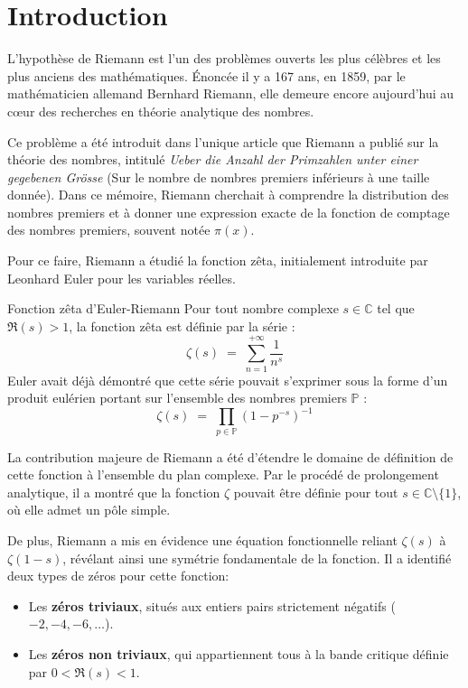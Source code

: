\documentclass[Riemann_Hypothesis.tex]{subfiles}
\begin{document}
\pagebreak
\color{red}
\part{Introduction}
\color{black}

L'hypothèse de Riemann est l'un des problèmes ouverts les plus célèbres 
et les plus anciens des mathématiques. Énoncée il y a 167 ans, en 1859, par 
le mathématicien allemand Bernhard Riemann, elle demeure encore aujourd'hui 
au cœur des recherches en théorie analytique des nombres. 

Ce problème a été introduit dans l'unique article que Riemann a publié sur la théorie 
des nombres, intitulé \textit{Ueber die Anzahl der Primzahlen unter einer gegebenen 
Grösse} (Sur le nombre de nombres premiers inférieurs à une taille donnée). 
Dans ce mémoire, Riemann cherchait à comprendre la distribution des 
nombres premiers et à donner une expression exacte de la fonction de comptage des 
nombres premiers, souvent notée $\pi(x)$.

Pour ce faire, Riemann a étudié la fonction zêta, initialement introduite 
par Leonhard Euler pour les variables réelles.

\begin{DefNef}[label=df:FonctionZetaEuler]{Fonction zêta d'Euler-Riemann}
    Pour tout nombre complexe $s \in \mathbb{C}$ tel que $\Re(s) > 1$, la fonction zêta est définie par la série :
    \begin{equation*}
        \zeta(s) \;=\; \sum_{n=1}^{+\infty} \frac{1}{n^s}
    \end{equation*}
    Euler avait déjà démontré que cette série pouvait 
    s'exprimer sous la forme d'un produit eulérien portant sur l'ensemble des 
    nombres premiers $\mathbb{P}$ :
    \begin{equation*}
        \zeta(s) \;=\; \prod_{p \in \mathbb{P}} \left(1 - p^{-s}\right)^{-1}
    \end{equation*}
\end{DefNef}

La contribution majeure de Riemann a été d'étendre le domaine de définition de 
cette fonction à l'ensemble du plan complexe. Par le procédé de prolongement 
analytique, il a montré que la fonction $\zeta$ pouvait être définie pour tout 
$s \in \mathbb{C} \setminus \{1\}$, où elle admet un pôle simple. 

De plus, Riemann a mis en évidence une équation fonctionnelle reliant $\zeta(s)$ 
à $\zeta(1-s)$, révélant ainsi une symétrie fondamentale de la fonction. 
Il a identifié deux types de zéros pour cette fonction:
\begin{itemize}
    \item Les \textbf{zéros triviaux}, situés aux entiers pairs strictement négatifs ($-2, -4, -6, \dots$).
    \item Les \textbf{zéros non triviaux}, qui appartiennent tous à la bande critique définie par $0 < \Re(s) < 1$.
\end{itemize}
\end{document}
